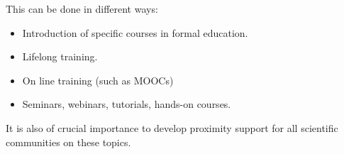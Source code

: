 This can be done in different ways:

\begin{itemize}
\item Introduction of specific courses in formal education.
\item Lifelong training.
\item On line training (such as MOOCs)
\item Seminars, webinars, tutorials, hands-on courses.
\end{itemize}

It is also of crucial importance to develop proximity support for all scientific communities on these topics.

